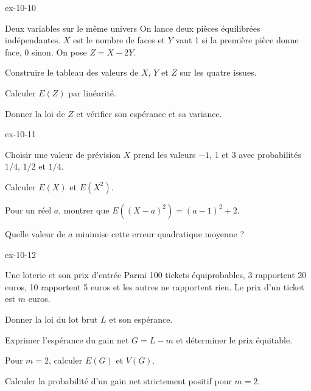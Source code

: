 \begin{blocLivre}{ex-10-10}
\begin{exercice}[2]{Deux variables sur le même univers}
On lance deux pièces équilibrées indépendantes. $X$ est le nombre de faces et $Y$ vaut 1 si la première pièce donne face, 0 sinon. On pose $Z=X-2Y$.\begin{questions}
\item Construire le tableau des valeurs de $X$, $Y$ et $Z$ sur les quatre issues.
\item Calculer $E(Z)$ par linéarité.
\item Donner la loi de $Z$ et vérifier son espérance et sa variance.
\end{questions}
\end{exercice}
\end{blocLivre}
\begin{blocLivre}{ex-10-11}
\begin{exercice}[2]{Choisir une valeur de prévision}
$X$ prend les valeurs $-1$, 1 et 3 avec probabilités $1/4$, $1/2$ et $1/4$.\begin{questions}
\item Calculer $E(X)$ et $E(X^2)$.
\item Pour un réel $a$, montrer que $E((X-a)^2)=(a-1)^2+2$.
\item Quelle valeur de $a$ minimise cette erreur quadratique moyenne ?
\end{questions}
\end{exercice}
\end{blocLivre}
\clearpage
{}
\begin{blocLivre}{ex-10-12}
\begin{exercice}[3]{Une loterie et son prix d'entrée}
Parmi 100 tickets équiprobables, 3 rapportent 20 euros, 10 rapportent 5 euros et les autres ne rapportent rien. Le prix d’un ticket est $m$ euros.\begin{questions}
\item Donner la loi du lot brut $L$ et son espérance.
\item Exprimer l’espérance du gain net $G=L-m$ et déterminer le prix équitable.
\item Pour $m=2$, calculer $E(G)$ et $V(G)$.
\item Calculer la probabilité d’un gain net strictement positif pour $m=2$.
\end{questions}
\end{exercice}
\end{blocLivre}
